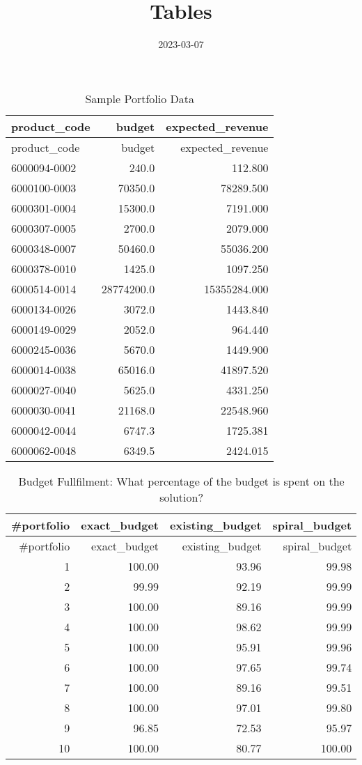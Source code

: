 \documentclass[
]{article}
\title{Tables}
\author{}
\date{\vspace{-2.5em}2023-03-07}
\begin{document}
\maketitle

\begin{longtable}[]{@{}lrr@{}}
\caption{Sample Portfolio Data}\tabularnewline
\toprule()
product\_code & budget & expected\_revenue \\
\midrule()
\endfirsthead
\toprule()
product\_code & budget & expected\_revenue \\
\midrule()
\endhead
6000094-0002 & 240.0 & 112.800 \\
6000100-0003 & 70350.0 & 78289.500 \\
6000301-0004 & 15300.0 & 7191.000 \\
6000307-0005 & 2700.0 & 2079.000 \\
6000348-0007 & 50460.0 & 55036.200 \\
6000378-0010 & 1425.0 & 1097.250 \\
6000514-0014 & 28774200.0 & 15355284.000 \\
6000134-0026 & 3072.0 & 1443.840 \\
6000149-0029 & 2052.0 & 964.440 \\
6000245-0036 & 5670.0 & 1449.900 \\
6000014-0038 & 65016.0 & 41897.520 \\
6000027-0040 & 5625.0 & 4331.250 \\
6000030-0041 & 21168.0 & 22548.960 \\
6000042-0044 & 6747.3 & 1725.381 \\
6000062-0048 & 6349.5 & 2424.015 \\
\bottomrule()
\end{longtable}

\newpage

\begin{longtable}[]{@{}rrrr@{}}
\caption{Budget Fullfilment: What percentage of the budget is spent on
the solution?}\tabularnewline
\toprule()
\#portfolio & exact\_budget & existing\_budget & spiral\_budget \\
\midrule()
\endfirsthead
\toprule()
\#portfolio & exact\_budget & existing\_budget & spiral\_budget \\
\midrule()
\endhead
1 & 100.00 & 93.96 & 99.98 \\
2 & 99.99 & 92.19 & 99.99 \\
3 & 100.00 & 89.16 & 99.99 \\
4 & 100.00 & 98.62 & 99.99 \\
5 & 100.00 & 95.91 & 99.96 \\
6 & 100.00 & 97.65 & 99.74 \\
7 & 100.00 & 89.16 & 99.51 \\
8 & 100.00 & 97.01 & 99.80 \\
9 & 96.85 & 72.53 & 95.97 \\
10 & 100.00 & 80.77 & 100.00 \\
\bottomrule()
\end{longtable}
\end{document}

